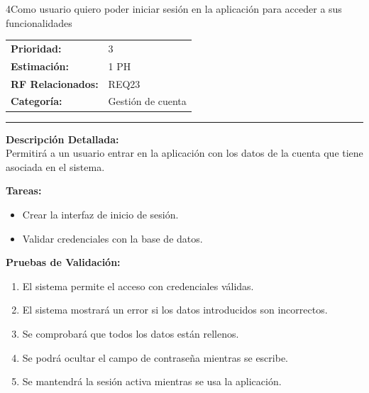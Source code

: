 \begin{hu_card}{4}{Como usuario quiero poder iniciar sesión en la aplicación para acceder a sus funcionalidades}
    \begin{tabularx}{\linewidth}{l X}
        \textbf{Prioridad:}   & 3 \\
        \textbf{Estimación:}  & 1 PH \\
        \textbf{RF Relacionados:} & REQ23 \\
        \textbf{Categoría:} & Gestión de cuenta \\
    \end{tabularx}

    \vspace{2mm}
    \hrule
    \vspace{2mm}

    \textbf{Descripción Detallada:} \\
    Permitirá a un usuario entrar en la aplicación con los datos de la cuenta que tiene asociada en el sistema.

    \vspace{2mm}
    \textbf{Tareas:}
    \begin{itemize}[noitemsep, topsep=0pt]
        \item Crear la interfaz de inicio de sesión.
        \item Validar credenciales con la base de datos.
    \end{itemize}

    \vspace{2mm}
    \textbf{Pruebas de Validación:}
    \begin{enumerate}[noitemsep, topsep=0pt]
        \item El sistema permite el acceso con credenciales válidas.
        \item El sistema mostrará un error si los datos introducidos son incorrectos.
        \item Se comprobará que todos los datos están rellenos.
        \item Se podrá ocultar el campo de contraseña mientras se escribe.
        \item Se mantendrá la sesión activa mientras se usa la aplicación.
    \end{enumerate}
\end{hu_card}

